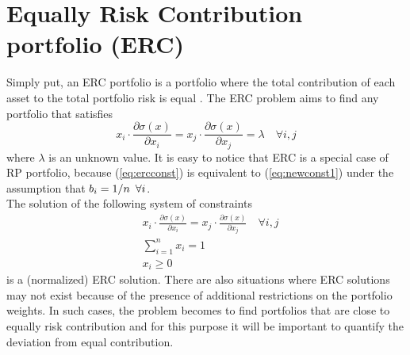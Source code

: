 \section{Equally Risk Contribution portfolio (ERC)}
Simply put, an ERC portfolio is a portfolio where the total contribution of each asset to the total portfolio risk is equal \cite{tutuncu}. The ERC problem aims to find any portfolio that satisfies
\begin{equation}\label{eq:ercconst}
x_i\cdot\frac{\partial\sigma (x)}{\partial x_i} = x_j\cdot\frac{\partial\sigma (x)}{\partial x_j} = \lambda \quad \forall i,j
\end{equation}
where $\lambda$ is an unknown value. It is easy to notice that ERC is a special case of RP portfolio, because (\ref{eq:ercconst}) is equivalent to (\ref{eq:newconst1}) under the assumption that $b_i = 1/n \hspace{0.5em} \forall i$.\\
The solution of the following system of constraints
\begin{equation}\label{eq:b}
\begin{aligned}
&x_i\cdot\frac{\partial\sigma (x)}{\partial x_i} = x_j\cdot\frac{\partial\sigma (x)}{\partial x_j} \quad \forall i,j\\
&\sum_{i=1}^n x_i =1\\
&x_i \geq 0
\end{aligned}
\end{equation}
is a (normalized) ERC solution. There are also situations where ERC solutions may not exist because of the presence of additional restrictions on the portfolio weights. In such cases, the problem becomes to find portfolios that are close to equally risk contribution and for this purpose it will be important to quantify the deviation from equal contribution.

